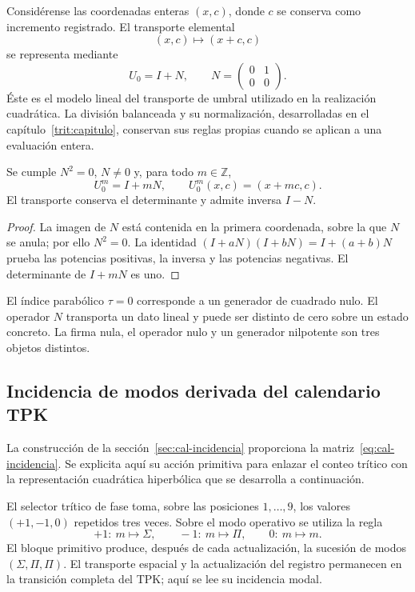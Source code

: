 Considérense las coordenadas enteras \((x,c)\), donde \(c\) se conserva
como incremento registrado. El transporte elemental
\[
 (x,c)\longmapsto(x+c,c)
\]
se representa mediante
\[
 U_0=I+N,
 \qquad N=\begin{pmatrix}0&1\\0&0\end{pmatrix}.
\]
Éste es el modelo lineal del transporte de umbral utilizado en la
realización cuadrática. La división balanceada y su normalización,
desarrolladas en el capítulo~\ref{trit:capitulo}, conservan sus reglas
propias cuando se aplican a una evaluación entera.

\begin{proposicion}
\label{eul:prop:parabolico}
Se cumple \(N^2=0\), \(N\ne0\) y, para todo \(m\in\mathbb Z\),
\[
 U_0^m=I+mN,
 \qquad U_0^m(x,c)=(x+mc,c).
\]
El transporte conserva el determinante y admite inversa \(I-N\).
\end{proposicion}
\begin{proof}
La imagen de \(N\) está contenida en la primera coordenada, sobre la
que \(N\) se anula; por ello \(N^2=0\). La identidad
\((I+aN)(I+bN)=I+(a+b)N\) prueba las potencias positivas, la inversa y
las potencias negativas. El determinante de \(I+mN\) es uno.
\end{proof}

El índice parabólico \(\tau=0\) corresponde a un generador de cuadrado
nulo. El operador \(N\) transporta un dato lineal y puede ser distinto
de cero sobre un estado concreto. La firma nula, el operador nulo y un
generador nilpotente son tres objetos distintos.

\subsection{Incidencia de modos derivada del calendario TPK}
\label{eul:incidencia-modos}

La construcción de la sección~\ref{sec:cal-incidencia} proporciona
la matriz~\eqref{eq:cal-incidencia}. Se explicita aquí su acción
primitiva para enlazar el conteo trítico con la representación cuadrática
hiperbólica que se desarrolla a continuación.

El selector trítico de fase toma, sobre las posiciones \(1,\ldots,9\),
los valores \((+1,-1,0)\) repetidos tres veces. Sobre el modo operativo
se utiliza la regla
\[
 +1:\ m\mapsto\Sigma,\qquad
 -1:\ m\mapsto\Pi,\qquad
 0:\ m\mapsto m.
\]
El bloque primitivo produce, después de cada actualización, la sucesión
de modos \((\Sigma,\Pi,\Pi)\). El transporte espacial y la actualización
del registro permanecen en la transición completa del TPK; aquí se lee
su incidencia modal.


